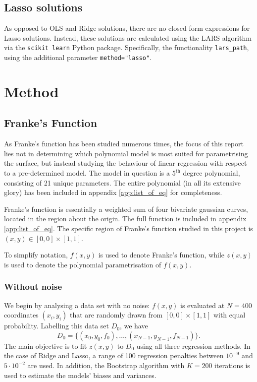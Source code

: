\documentclass[reprint,english]{revtex4-1}
\begin{document}
\subsection{Lasso solutions}
As opposed to OLS and Ridge solutions, there are no closed form expressions for Lasso solutions. Instead, these solutions are calculated using the LARS algorithm via the \texttt{scikit learn} Python package. Specifically, the functionality \texttt{lars\_path}, using the additional parameter \texttt{method="lasso"}.
\section{Method}
\subsection{Franke's Function}
As Franke's function has been studied numerous times, the focus of this report lies not in determining which polynomial model is most suited for parametrising the surface, but instead studying the behaviour of linear regression with respect to a pre-determined model. The model in question is a \(5^{\text{th}}\) degree polynomial, consisting of 21 unique parameters. The entire polynomial (in all its extensive glory) has been included in appendix \ref{app:list_of_eq} for completeness.

Franke's function is essentially a weighted sum of four bivariate gaussian curves, located in the region about the origin. The full function is included in appendix \ref{app:list_of_eq}. The specific region of Franke's function studied in this project is \((x,y)\in[0,0]\times[1,1]\).

To simplify notation, \(f(x,y)\) is used to denote Franke's function, while \(z(x,y)\) is used to denote the polynomial parametrisation of \(f(x,y)\).
\subsubsection{Without noise}\label{sec:Franke:without_noise}
We begin by analysing a data set with no noise: \(f(x,y)\) is evaluated at \(N=400\) coordinates \((x_i,y_i)\) that are randomly drawn from \([0,0]\times[1,1]\) with equal probability. Labelling this data set \(D_0\), we have
\begin{equation}
D_0=\{(x_0,y_0,f_0),\ldots,(x_{N-1},y_{N-1},f_{N-1})\}.
\end{equation}
The main objective is to fit \(z(x,y)\) to \(D_0\) using all three regression methods. In the case of Ridge and Lasso, a range of 100 regression penalties between \(10^{-9}\) and \(5\cdot10^{-2}\) are used. In addition, the Bootstrap algorithm with \(K=200\) iterations is used to estimate the models' biases and variances. 
\end{document}
